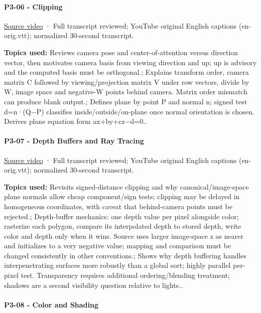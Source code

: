 \paragraph{P3-06 - Clipping}\label{p3-06---clipping}

\href{https://www.youtube.com/watch?v=og7hOFypKpQ}{Source video} · Full transcript reviewed; YouTube original English captions (en-orig.vtt); normalized 30-second transcript.

\textbf{Topics used:} Reviews camera pose and center-of-attention versus direction vector, then motivates camera basis from viewing direction and up; up is advisory and the computed basis must be orthogonal.; Explains transform order, camera matrix C followed by viewing/projection matrix V under row vectors, divide by W, image space and negative-W points behind camera. Matrix order mismatch can produce blank output.; Defines plane by point P and normal n; signed test d=n·(Q−P) classifies inside/outside/on-plane once normal orientation is chosen. Derives plane equation form ax+by+cz−d=0..

\paragraph{P3-07 - Depth Buffers and Ray Tracing}\label{p3-07---depth-buffers-and-ray-tracing}

\href{https://www.youtube.com/watch?v=Xks1v4GNUiY}{Source video} · Full transcript reviewed; YouTube original English captions (en-orig.vtt); normalized 30-second transcript.

\textbf{Topics used:} Revisits signed-distance clipping and why canonical/image-space plane normals allow cheap component/sign tests; clipping may be delayed in homogeneous coordinates, with caveat that behind-camera points must be rejected.; Depth-buffer mechanics: one depth value per pixel alongside color; rasterize each polygon, compare its interpolated depth to stored depth, write color and depth only when it wins. Source uses larger image-space z as nearer and initializes to a very negative value; mapping and comparison must be changed consistently in other conventions.; Shows why depth buffering handles interpenetrating surfaces more robustly than a global sort; highly parallel per-pixel test. Transparency requires additional ordering/blending treatment; shadows are a second visibility question relative to lights..

\paragraph{P3-08 - Color and Shading}\label{p3-08---color-and-shading}

